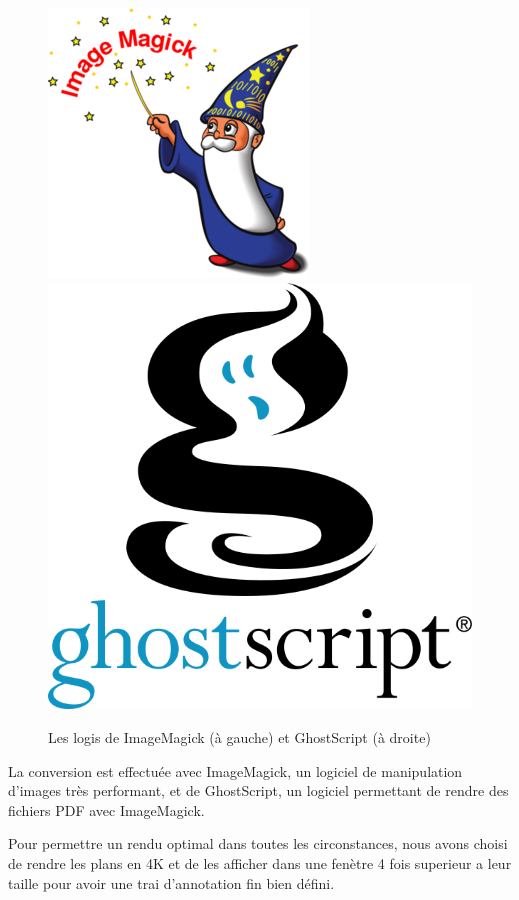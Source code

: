 \begin{figure}[h]
    \centering
    \includegraphics[scale=0.3]{img/image-magick.png}
    \hspace{5cm}
    \includegraphics[scale=0.13]{img/ghostscript.png}
    \caption{Les logis de ImageMagick (à gauche) et GhostScript (à droite)}
\end{figure}

La conversion est effectuée avec ImageMagick, un logiciel de manipulation d'images très performant, et de GhostScript, un logiciel permettant de rendre des fichiers PDF avec ImageMagick.

Pour permettre un rendu optimal dans toutes les circonstances, nous avons choisi de rendre les plans en 4K et de les afficher dans une fenètre 4 fois superieur a leur taille pour avoir une trai d'annotation fin bien défini.